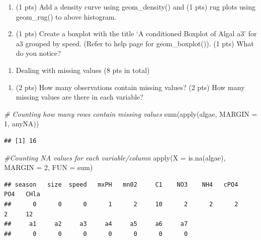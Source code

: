 \documentclass[
]{article}
\newenvironment{Shaded}{\begin{snugshade}}{\end{snugshade}}
\newcommand{\AttributeTok}[1]{\textcolor[rgb]{0.77,0.63,0.00}{#1}}
\newcommand{\CommentTok}[1]{\textcolor[rgb]{0.56,0.35,0.01}{\textit{#1}}}
\newcommand{\DecValTok}[1]{\textcolor[rgb]{0.00,0.00,0.81}{#1}}
\newcommand{\FunctionTok}[1]{\textcolor[rgb]{0.00,0.00,0.00}{#1}}
\newcommand{\NormalTok}[1]{#1}
\providecommand{\tightlist}{%
  \setlength{\itemsep}{0pt}\setlength{\parskip}{0pt}}
\begin{document}
\begin{enumerate}
\def\labelenumi{\alph{enumi}.}
\setcounter{enumi}{1}
\item
  (1 pts) Add a density curve using geom\_density() and (1 pts) rug
  plots using geom\_rug() to above histogram.
\item
  (1 pts) Create a boxplot with the title `A conditioned Boxplot of
  Algal a3' for a3 grouped by speed. (Refer to help page for
  geom\_boxplot()). (1 pts) What do you notice?
\end{enumerate}

\begin{enumerate}
\def\labelenumi{\arabic{enumi}.}
\setcounter{enumi}{2}
\tightlist
\item
  Dealing with missing values (8 pts in total)
\end{enumerate}

\begin{enumerate}
\def\labelenumi{\alph{enumi}.}
\tightlist
\item
  (2 pts) How many observations contain missing values? (2 pts) How many
  missing values are there in each variable?
\end{enumerate}

\begin{Shaded}
\begin{Highlighting}[]
\CommentTok{\# Counting how many rows contain missing values}
\FunctionTok{sum}\NormalTok{(}\FunctionTok{apply}\NormalTok{(algae, }\AttributeTok{MARGIN =} \DecValTok{1}\NormalTok{, anyNA))}
\end{Highlighting}
\end{Shaded}

\begin{verbatim}
## [1] 16
\end{verbatim}

\begin{Shaded}
\begin{Highlighting}[]
\CommentTok{\#Counting NA values for each variable/column}
\FunctionTok{apply}\NormalTok{(}\AttributeTok{X =} \FunctionTok{is.na}\NormalTok{(algae), }\AttributeTok{MARGIN =} \DecValTok{2}\NormalTok{, }\AttributeTok{FUN =}\NormalTok{ sum)}
\end{Highlighting}
\end{Shaded}

\begin{verbatim}
## season   size  speed   mxPH   mn02     C1    NO3    NH4   cPO4    PO4   CHla 
##      0      0      0      1      2     10      2      2      2      2     12 
##     a1     a2     a3     a4     a5     a6     a7 
##      0      0      0      0      0      0      0
\end{verbatim}
\end{document}
